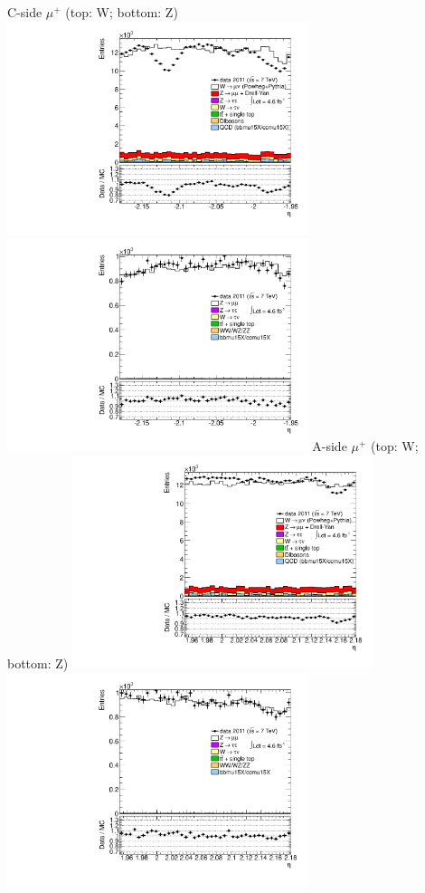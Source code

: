  {
\colb[T]
C-side $\mu^{+}$ (top: W; bottom: Z)
\centering
\includegraphics[width=0.66\textwidth]{dates/20130306/figures/etaphi/W_10_C_stack_l_eta_POS} \\
\includegraphics[width=0.66\textwidth]{dates/20130306/figures/etaphi/Z_10_C_stack_lP_eta_ALL.pdf}
A-side $\mu^{+}$ (top: W; bottom: Z)
\centering
\includegraphics[width=0.66\textwidth]{dates/20130306/figures/etaphi/W_10_A_stack_l_eta_POS} \\
\includegraphics[width=0.66\textwidth]{dates/20130306/figures/etaphi/Z_10_A_stack_lP_eta_ALL.pdf} 
\cole
}
